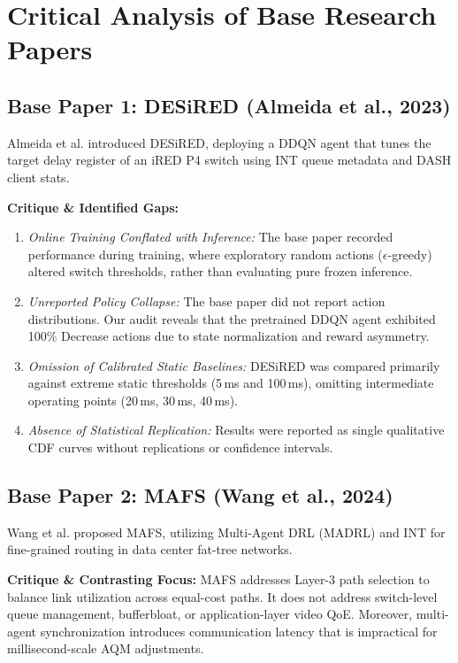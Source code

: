 \documentclass[12pt,a4paper,oneside]{report}
\begin{document}
\section{Critical Analysis of Base Research Papers}

\subsection{Base Paper 1: DESiRED (Almeida et al., 2023)}
Almeida et al. \cite{almeida2023desired} introduced DESiRED, deploying a DDQN agent that tunes the target delay register of an iRED P4 switch using INT queue metadata and DASH client stats.

\textbf{Critique \& Identified Gaps:}
\begin{enumerate}[label=(\alph*)]
  \item \emph{Online Training Conflated with Inference:} The base paper recorded performance during training, where exploratory random actions ($\epsilon$-greedy) altered switch thresholds, rather than evaluating pure frozen inference.
  \item \emph{Unreported Policy Collapse:} The base paper did not report action distributions. Our audit reveals that the pretrained DDQN agent exhibited 100\% Decrease actions due to state normalization and reward asymmetry.
  \item \emph{Omission of Calibrated Static Baselines:} DESiRED was compared primarily against extreme static thresholds (5\,ms and 100\,ms), omitting intermediate operating points (20\,ms, 30\,ms, 40\,ms).
  \item \emph{Absence of Statistical Replication:} Results were reported as single qualitative CDF curves without replications or confidence intervals.
\end{enumerate}

\subsection{Base Paper 2: MAFS (Wang et al., 2024)}
Wang et al. \cite{wang2024mafs} proposed MAFS, utilizing Multi-Agent DRL (MADRL) and INT for fine-grained routing in data center fat-tree networks.

\textbf{Critique \& Contrasting Focus:} MAFS addresses Layer-3 path selection to balance link utilization across equal-cost paths. It does not address switch-level queue management, bufferbloat, or application-layer video QoE. Moreover, multi-agent synchronization introduces communication latency that is impractical for millisecond-scale AQM adjustments.
\end{document}
